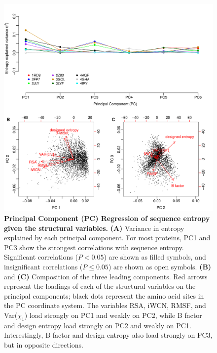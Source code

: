 \documentclass[12pt]{article}
\begin{document}
\begin{figure}[tbh]
\begin{center}
       \includegraphics[width=6.5in]{cor_entropy_PC_screen.pdf}
\end{center}
\caption{\textbf{Principal Component (PC) Regression of sequence entropy given the structural variables.} {\bf (A)} Variance in entropy explained by each principal component. For most proteins, PC1 and PC3 show the strongest correlations with sequence entropy. Significant correlations ($P<0.05$) are shown as filled symbols, and insignificant correlations ($P\leq0.05$) are shown as open symbols. {\bf (B)} and {\bf (C)} Composition of the three leading components. Red arrows represent the loadings of each of the structural variables on the principal components; black dots represent the amino acid sites in the PC coordinate system. The variables RSA, iWCN, RMSF, and Var($\chi_1$) load strongly on PC1 and weakly on PC2, while B factor and design entropy load strongly on PC2 and weakly on PC1. Interestingly, B factor and design entropy also load strongly on PC3, but in opposite directions.}
\label{fig:cor_entropy_PC_screen}
\end{figure}
\end{document}
